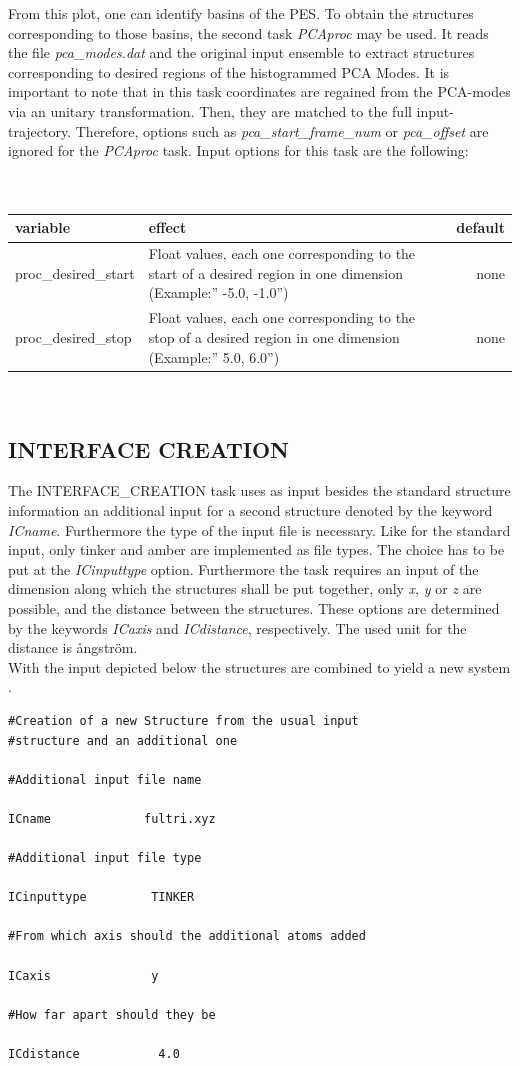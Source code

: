 \documentclass[10pt,a4paper]{article} %
\begin{document}
	From this plot, one can identify basins of the \acl{PES}. To obtain the structures corresponding to those basins, the second task \textit{PCAproc} may be used. It reads the file \textit{pca\_modes.dat} and the original input ensemble to extract structures corresponding to desired regions of the histogrammed \ac{PCA} Modes. It is important to note that in this task coordinates are regained from the PCA-modes via an unitary transformation. Then, they are matched to the full input-trajectory. Therefore, options such as \textit{pca\_start\_frame\_num} or \textit{pca\_offset} are ignored for the \textit{PCAproc} task. Input options for this task are the following:\\~\\~\\
	\begin{tabularx}{\textwidth}{l|X|r}
		variable & effect & default\\
		\hline			
		proc\_desired\_start & Float values, each one corresponding to the start of a desired region in one dimension (Example:'' -5.0, -1.0'') & none\\
		proc\_desired\_stop & Float values, each one corresponding to the stop of a desired region in one dimension (Example:'' 5.0, 6.0'') & none\\
	\end{tabularx}~\\

	\subsection{INTERFACE CREATION}
	The INTERFACE\_CREATION task uses as input besides the standard structure information an additional input for a second structure denoted by the keyword \textit{ICname}. Furthermore the type of the input file is necessary. Like for the standard input, only tinker and amber are implemented as file types. The choice has to be put at the \textit{ICinputtype} option. Furthermore the task requires an input of the dimension along which the structures shall be put together, only \textit{x}, \textit{y} or \textit{z} are possible, and the distance between the structures. These options are determined by the keywords \textit{ICaxis} and \textit{ICdistance}, respectively. The used unit for the distance is \aa ngström.\\
With the input depicted below the structures are combined to yield a new system .

\begin{lstlisting}
#Creation of a new Structure from the usual input 
#structure and an additional one

#Additional input file name

ICname             fultri.xyz

#Additional input file type 

ICinputtype         TINKER

#From which axis should the additional atoms added 

ICaxis              y

#How far apart should they be 

ICdistance           4.0
\end{lstlisting}
\end{document}
